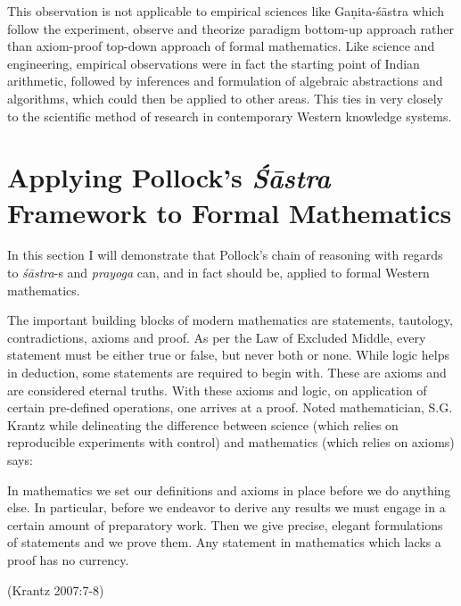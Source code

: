 This observation is not applicable to empirical sciences like Gaṇita-śāstra which follow the experiment, observe and theorize paradigm bottom-up approach rather than axiom-proof top-down approach of formal mathematics. Like science and engineering, empirical observations were in fact the starting point of Indian arithmetic, followed by inferences and formulation of algebraic abstractions and algorithms, which could then be applied to other areas. This ties in very closely to the scientific method of research in contemporary Western knowledge systems.

\section*{Applying Pollock’s {\sl\bfseries Śāstra} Framework to Formal Mathematics}

In this section I will demonstrate that Pollock’s chain of reasoning with regards to {\sl śāstra}-s and {\sl prayoga} can, and in fact should be, applied to formal Western mathematics.

The important building blocks of modern mathematics are statements, tautology, contradictions, axioms and proof. As per the Law of Excluded Middle, every statement must be either true or false, but never both or none.  While logic helps in deduction, some statements are required to begin with. These are axioms and are considered eternal truths. With these axioms and logic, on application of certain pre-defined operations, one arrives at a proof. Noted mathematician, S.G. Krantz while delineating the difference between science (which relies on reproducible experiments with control) and mathematics (which relies on axioms) says: 
\begin{myquote}
In mathematics we set our definitions and axioms in place before we do anything else. In particular, before we endeavor to derive any results we must engage in a certain amount of preparatory work. Then we give precise, elegant formulations of statements and we prove them. Any statement in mathematics which lacks a proof has no currency. 	

\hfill (Krantz  2007:7-8)
\end{myquote}

